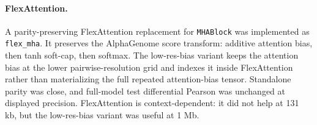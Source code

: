 \documentclass[11pt]{article}
\begin{document}
\paragraph{FlexAttention.}
A parity-preserving FlexAttention replacement for \texttt{MHABlock} was
implemented as \texttt{flex\_mha}. It preserves the AlphaGenome score transform:
additive attention bias, then tanh soft-cap, then softmax. The low-res-bias
variant keeps the attention bias at the lower pairwise-resolution grid and
indexes it inside FlexAttention rather than materializing the full repeated
attention-bias tensor. Standalone parity was close, and full-model test
differential Pearson was unchanged at displayed precision. FlexAttention is
context-dependent: it did not help at 131 kb, but the low-res-bias variant was
useful at 1 Mb.
\end{document}
